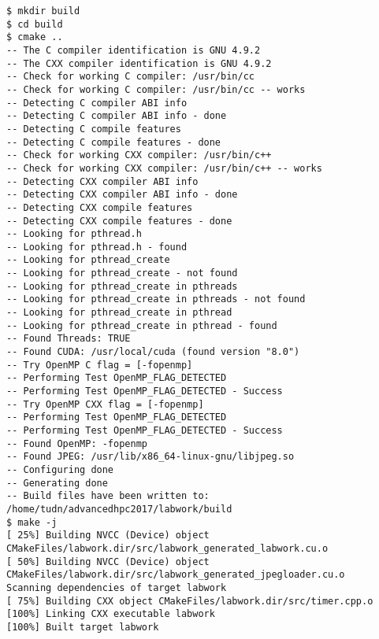 \documentclass[12pt]{article}
\begin{document}
\begin{lstlisting}[breaklines]
$ mkdir build
$ cd build
$ cmake ..
-- The C compiler identification is GNU 4.9.2
-- The CXX compiler identification is GNU 4.9.2
-- Check for working C compiler: /usr/bin/cc
-- Check for working C compiler: /usr/bin/cc -- works
-- Detecting C compiler ABI info
-- Detecting C compiler ABI info - done
-- Detecting C compile features
-- Detecting C compile features - done
-- Check for working CXX compiler: /usr/bin/c++
-- Check for working CXX compiler: /usr/bin/c++ -- works
-- Detecting CXX compiler ABI info
-- Detecting CXX compiler ABI info - done
-- Detecting CXX compile features
-- Detecting CXX compile features - done
-- Looking for pthread.h
-- Looking for pthread.h - found
-- Looking for pthread_create
-- Looking for pthread_create - not found
-- Looking for pthread_create in pthreads
-- Looking for pthread_create in pthreads - not found
-- Looking for pthread_create in pthread
-- Looking for pthread_create in pthread - found
-- Found Threads: TRUE
-- Found CUDA: /usr/local/cuda (found version "8.0")
-- Try OpenMP C flag = [-fopenmp]
-- Performing Test OpenMP_FLAG_DETECTED
-- Performing Test OpenMP_FLAG_DETECTED - Success
-- Try OpenMP CXX flag = [-fopenmp]
-- Performing Test OpenMP_FLAG_DETECTED
-- Performing Test OpenMP_FLAG_DETECTED - Success
-- Found OpenMP: -fopenmp
-- Found JPEG: /usr/lib/x86_64-linux-gnu/libjpeg.so
-- Configuring done
-- Generating done
-- Build files have been written to: /home/tudn/advancedhpc2017/labwork/build
$ make -j
[ 25%] Building NVCC (Device) object CMakeFiles/labwork.dir/src/labwork_generated_labwork.cu.o
[ 50%] Building NVCC (Device) object CMakeFiles/labwork.dir/src/labwork_generated_jpegloader.cu.o
Scanning dependencies of target labwork
[ 75%] Building CXX object CMakeFiles/labwork.dir/src/timer.cpp.o
[100%] Linking CXX executable labwork
[100%] Built target labwork
\end{lstlisting}

\end{document}
